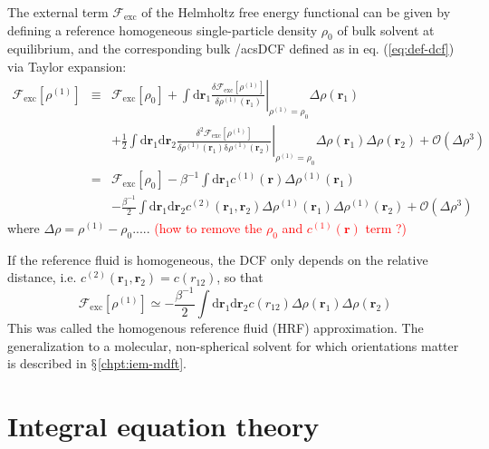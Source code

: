 The external term $\mathcal{F}_{\mathrm{exc}}$ of the Helmholtz free
energy functional can be given by defining a reference homogeneous
single-particle density $\rho_{0}$ of bulk solvent at equilibrium,
and the corresponding bulk /acs{DCF} defined as in eq. (\ref{eq:def-dcf})
via Taylor expansion:
\begin{eqnarray}
\mathcal{F}_{\mathrm{exc}}\left[\rho^{(1)}\right] & \equiv & \mathcal{F}_{\mathrm{exc}}\left[\rho_{0}\right]+\int\mathrm{d}\mathbf{r}_{1}\left.\frac{\delta\mathcal{F}_{\mathrm{exc}}\left[\rho^{(1)}\right]}{\delta\rho^{(1)}(\mathbf{r}_{1})}\right|_{\rho^{(1)}=\rho_{0}}\Delta\rho(\mathbf{r}_{1})\nonumber \\
 &  & +\frac{1}{2}\int\mathrm{d}\mathbf{\mathbf{r}}_{1}\mathrm{d}\mathbf{r}_{2}\left.\frac{\delta^{2}\mathcal{F}_{\mathrm{exc}}\left[\rho^{(1)}\right]}{\delta\rho^{(1)}(\mathbf{r}_{1})\mathrm{\delta}\rho^{(1)}(\mathbf{r}_{2})}\right|_{\rho^{(1)}=\rho_{0}}\Delta\rho(\mathbf{r}_{1})\Delta\rho(\mathbf{r}_{2})+\mathcal{O}(\Delta\rho^{3})\\
 & = & \mathcal{F}_{\mathrm{exc}}\left[\rho_{0}\right]-\beta^{-1}\int\mathrm{d}\mathbf{r}_{1}c^{(1)}(\mathbf{r})\Delta\rho^{(1)}(\mathbf{r}_{1})\nonumber \\
 &  & -\frac{\beta^{-1}}{2}\int\mathrm{d}\mathbf{\mathbf{r}}_{1}\mathrm{d}\mathbf{r}_{2}c^{(2)}(\mathbf{r}_{1},\mathbf{r}_{2})\Delta\rho^{(1)}(\mathbf{r}_{1})\Delta\rho^{(1)}(\mathbf{r}_{2})+\mathcal{O}(\Delta\rho{}^{3})
\end{eqnarray}
where $\Delta\rho=\rho^{(1)}-\rho_{0}$.....\textcolor{red}{{} (how
to remove the $\rho_{0}$ and $c^{(1)}(\mathbf{r})$ term ?)}

If the reference fluid is homogeneous, the DCF only depends on the
relative distance, i.e. $c^{(2)}(\mathbf{r}_{1},\mathbf{r}_{2})=c(r_{12})$,
so that
\begin{equation}
\mathcal{F}_{\mathrm{exc}}\left[\rho^{(1)}\right]\simeq-\frac{\beta^{-1}}{2}\int\mathrm{d}\mathbf{\mathbf{r}}_{1}\mathrm{d}\mathbf{r}_{2}c(r_{12})\Delta\rho(\mathbf{r}_{1})\Delta\rho(\mathbf{r}_{2})
\end{equation}
This was called the homogenous reference fluid (\acs{HRF}) approximation.
The generalization to a molecular, non-spherical solvent for which
orientations matter is described in $\mathsection$\ref{chpt:iem-mdft}.

\section{Integral equation theory}

